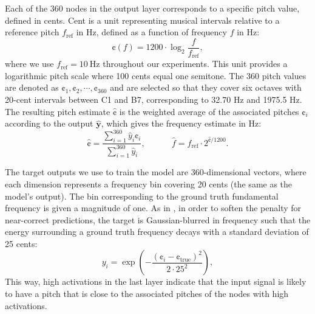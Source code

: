 Each of the 360 nodes in the output layer corresponds to a specific pitch value, defined in cents.
Cent is a unit representing musical intervals relative to a reference pitch $f_{\mathrm{ref}}$ in Hz, defined as a function of frequency $f$ in Hz:
\begin{equation}
\cent(f) = 1200 \cdot \log_2 \frac{f}{f_{\mathrm{ref}}},
\end{equation}
where we use $f_{\mathrm{ref}} = 10 \mathrm{~Hz}$ throughout our experiments. 
This unit provides a logarithmic pitch scale where 100 cents equal one semitone.
The 360 pitch values are denoted as $\cent_1, \cent_2, \cdots, \cent_{360}$ and are selected so that they cover six octaves with 20-cent intervals between C1 and B7, corresponding to 32.70 Hz and 1975.5 Hz. 
The resulting pitch estimate $\hat{\cent}$ is the weighted average of the associated pitches $\cent_i$ according to the output $\hat{\mathbf{y}}$, which gives the frequency estimate in Hz:
\begin{equation}\label{eqn:resulting}
\hat{\cent} = \frac{\sum_{i=1}^{360}\hat{y}_i \cent_i}{\sum_{i=1}^{360} \hat{y}_i}, ~~~~~~~~~~~~~~
\hat{f} = f_{\mathrm{ref}} \cdot 2 ^ {\hat{\cent} / 1200}.
\end{equation}

The target outputs we use to train the model are 360-dimensional vectors, where each dimension represents a frequency bin covering 20 cents (the same as the model's output).
The bin corresponding to the ground truth fundamental frequency is given a magnitude of one.
As in \cite{bittner2017deepsalience}, in order to soften the penalty for near-correct predictions, the target is Gaussian-blurred in frequency such that the energy surrounding a ground truth frequency decays with a standard deviation of 25 cents:
\begin{equation}\label{eqn:gaussian}
y_i = \exp \left ( {-\frac{(\cent_i - \cent_{\mathrm{true}})^2}{2 \cdot 25^2}} \right ),
\end{equation}
This way, high activations in the last layer indicate that the input signal is likely to have a pitch that is close to the associated pitches of the nodes with high activations.

